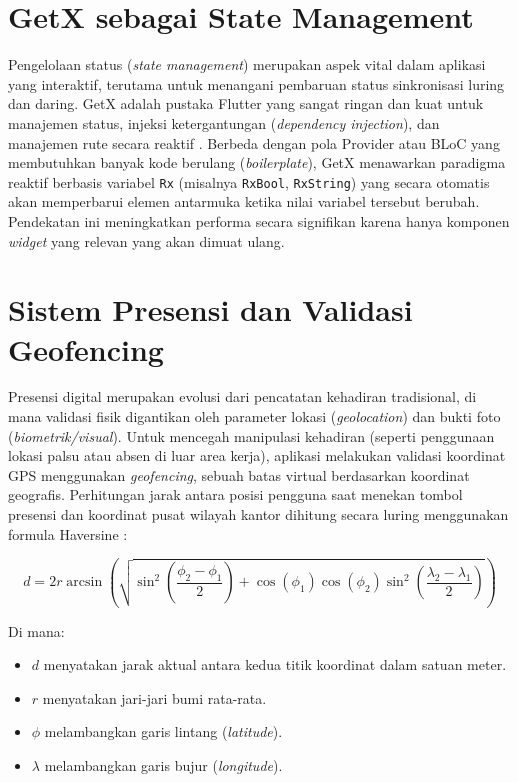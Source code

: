 \section{GetX sebagai State Management}
Pengelolaan status (\textit{state management}) merupakan aspek vital dalam aplikasi yang interaktif, terutama untuk menangani pembaruan status sinkronisasi luring dan daring. GetX adalah pustaka Flutter yang sangat ringan dan kuat untuk manajemen status, injeksi ketergantungan (\textit{dependency injection}), dan manajemen rute secara reaktif \cite{getx_docs}. Berbeda dengan pola Provider atau BLoC yang membutuhkan banyak kode berulang (\textit{boilerplate}), GetX menawarkan paradigma reaktif berbasis variabel \texttt{Rx} (misalnya \texttt{RxBool}, \texttt{RxString}) yang secara otomatis akan memperbarui elemen antarmuka ketika nilai variabel tersebut berubah. Pendekatan ini meningkatkan performa secara signifikan karena hanya komponen \textit{widget} yang relevan yang akan dimuat ulang.

\section{Sistem Presensi dan Validasi Geofencing}
Presensi digital merupakan evolusi dari pencatatan kehadiran tradisional, di mana validasi fisik digantikan oleh parameter lokasi (\textit{geolocation}) dan bukti foto (\textit{biometrik/visual}). Untuk mencegah manipulasi kehadiran (seperti penggunaan lokasi palsu atau absen di luar area kerja), aplikasi melakukan validasi koordinat GPS menggunakan \textit{geofencing}, sebuah batas virtual berdasarkan koordinat geografis. Perhitungan jarak antara posisi pengguna saat menekan tombol presensi dan koordinat pusat wilayah kantor dihitung secara luring menggunakan formula Haversine \cite{ismail2023presensihaversine}:

\begin{equation}
d = 2r \arcsin \left( \sqrt{\sin^2\left(\frac{\phi_2 - \phi_1}{2}\right) + \cos(\phi_1)\cos(\phi_2)\sin^2\left(\frac{\lambda_2 - \lambda_1}{2}\right)} \right)
\end{equation}

Di mana:
\begin{itemize}
    \item $d$ menyatakan jarak aktual antara kedua titik koordinat dalam satuan meter.
    \item $r$ menyatakan jari-jari bumi rata-rata.
    \item $\phi$ melambangkan garis lintang (\textit{latitude}).
    \item $\lambda$ melambangkan garis bujur (\textit{longitude}).
\end{itemize}

